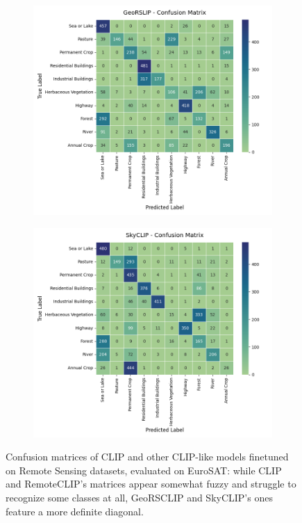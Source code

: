 \documentclass[a4paper, oneside, english]{sapthesis} %
\begin{document}
\begin{figure}[h]
  \medskip

  \begin{subfigure}[t]{.5\textwidth}
    \centering
    \includegraphics[width=\linewidth]{img/EuroSAT_GeoRSCLIP_32_cm.png}
  \end{subfigure}
  \hfill
  \begin{subfigure}[t]{.5\textwidth}
    \centering
    \includegraphics[width=\linewidth]{img/EuroSAT_SkyCLIP_32_cm.png}
  \end{subfigure}
  \caption{Confusion matrices of CLIP and other CLIP-like models finetuned on Remote Sensing datasets, evaluated on EuroSAT: while CLIP and RemoteCLIP's matrices appear somewhat fuzzy and struggle to recognize some classes at all, GeoRSCLIP and SkyCLIP's ones feature a more definite diagonal.}
\end{figure}
\end{document}
